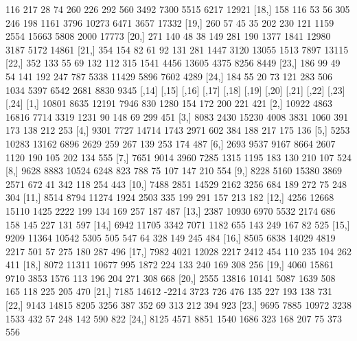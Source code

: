 \documentclass[a4paper, 12pt]{article}
\begin{document}
\begin{table}[H]
\begin{Schunk}
\begin{Soutput}
[17,]  116  217   28   74  260  226  292  560 3492  7300  5515  6217 12921
[18,]  158  116   53   56  305  246  198 1161 3796 10273  6471  3657 17332
[19,]  260   57   45   35  202  230  121 1159 2554 15663  5808  2000 17773
[20,]  271  140   48   38  149  281  190 1377 1841 12980  3187  5172 14861
[21,]  354  154   82   61   92  131  281 1447 3120 13055  1513  7897 13115
[22,]  352  133   55   69  132  112  315 1541 4456 13605  4375  8256  8449
[23,]  186   99   49   54  141  192  247  787 5338 11429  5896  7602  4289
[24,]  184   55   20   73  121  283  506 1034 5397  6542  2681  8830  9345
      [,14] [,15] [,16] [,17] [,18] [,19] [,20] [,21] [,22] [,23] [,24]
 [1,] 10801  8635 12191  7946   830  1280   154   172   200   221   421
 [2,] 10922  4863 16816  7714  3319  1231    90   148    69   299   451
 [3,]  8083  2430 15230  4008  3831  1060   391   173   138   212   253
 [4,]  9301  7727 14714  1743  2971   602   384   188   217   175   136
 [5,]  5253 10283 13162  6896  2629   259   267   139   253   174   487
 [6,]  2693  9537  9167  8664  2607  1120   190   105   202   134   555
 [7,]  7651  9014  3960  7285  1315  1195   183   130   210   107   524
 [8,]  9628  8883 10524  6248   823   788    75   107   147   210   554
 [9,]  8228  5160 15380  3869  2571   672    41   342   118   254   443
[10,]  7488  2851 14529  2162  3256   684   189   272    75   248   304
[11,]  8514  8794 11274  1924  2503   335   199   291   157   213   182
[12,]  4256 12668 15110  1425  2222   199   134   169   257   187   487
[13,]  2387 10930  6970  5532  2174   686   158   145   227   131   597
[14,]  6942 11705  3342  7071  1182   655   143   249   167    82   525
[15,]  9209 11364 10542  5305   505   547    64   328   149   245   484
[16,]  8505  6838 14029  4819  2217   501    57   275   180   287   496
[17,]  7982  4021 12028  2217  2412   454   110   235   104   262   411
[18,]  8072 11311 10677   995  1872   224   133   240   169   308   256
[19,]  4060 15861  9710  3853  1576   113   196   204   271   308   668
[20,]  2555 13816 10141  5087  1639   508   165   118   225   205   470
[21,]  7185 14612 -2214  3723   726   476   135   227   193   138   731
[22,]  9143 14815  8205  3256   387   352    69   313   212   394   923
[23,]  9695  7885 10972  3238  1533   432    57   248   142   590   822
[24,]  8125  4571  8851  1540  1686   323   168   207    75   373   556
\end{Soutput}
\end{Schunk}
\end{table}
\end{document}
